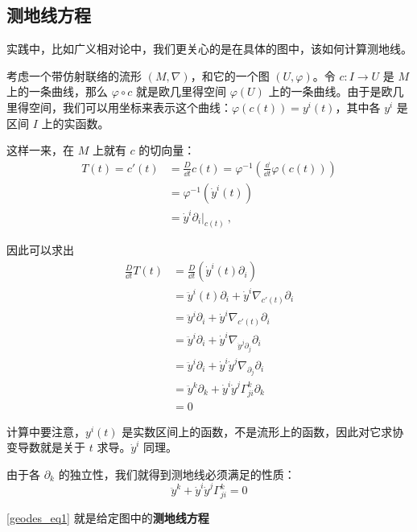 \subsection{测地线方程}

实践中，比如广义相对论中，我们更关心的是在具体的图中，该如何计算测地线。

考虑一个带仿射联络的流形 $(M, \nabla)$，和它的一个图 $(U, \varphi)$。令 $c:I\to U$ 是 $M$ 上的一条曲线，那么 $\varphi\circ c$ 就是欧几里得空间 $\varphi(U)$ 上的一条曲线。由于是欧几里得空间，我们可以用坐标来表示这个曲线：$\varphi(c(t))=y^i(t)$，其中各 $y^i$ 是区间 $I$ 上的实函数。


这样一来，在 $M$ 上就有 $c$ 的切向量：
\begin{equation}
\begin{aligned}
T(t)=c'(t)&=\frac{D}{\dd t}c(t)=\varphi^{-1}(\frac{\dd}{\dd t}\varphi(c(t)))\\
&=\varphi^{-1}(\dot{y}^i(t))\\
&=\dot{y}^i\partial_i|_{c(t)}~,
\end{aligned}
\end{equation}

因此可以求出
\begin{equation}
\begin{aligned}
\frac{D}{\dd t}T(t)&=\frac{D}{\dd t}(\dot{y}^i(t)\partial_i)\\
&=\ddot{y}^i(t)\partial_i+\dot{y}^i\nabla_{c'(t)}\partial_i\\
&=\ddot{y}^i\partial_i+\dot{y}^i\nabla_{c'(t)}\partial_i\\
&=\ddot{y}^i\partial_i+\dot{y}^i\nabla_{\dot{y}^j\partial_j}\partial_i\\
&=\ddot{y}^i\partial_i+\dot{y}^i\dot{y}^j\nabla_{\partial_j}\partial_i\\
&=\ddot{y}^k\partial_k+\dot{y}^i\dot{y}^j\Gamma^k_{ji}\partial_k\\
&=0
\end{aligned}
\end{equation}

计算中要注意，$y^i(t)$ 是实数区间上的函数，不是流形上的函数，因此对它求协变导数就是关于 $t$ 求导。$\dot{y}^i$ 同理。

由于各 $\partial_k$ 的独立性，我们就得到测地线必须满足的性质：
\begin{equation}\label{geodes_eq1}
\ddot{y}^k+\dot{y}^i\dot{y}^j\Gamma^k_{ji}=0
\end{equation}

\autoref{geodes_eq1} 就是给定图中的\textbf{测地线方程}


